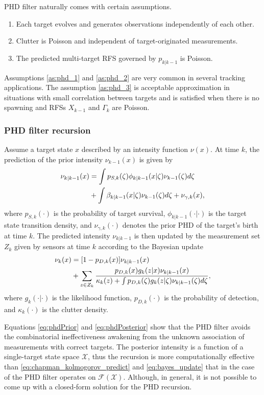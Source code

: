 PHD filter naturally comes with certain assumptions.
\begin{enumerate}
    \item Each target evolves and generates observations independently of each other. \label{as:phd_1}
    \item Clutter is Poisson and independent of target-originated measurements. \label{as:phd_2}
    \item The predicted multi-target RFS governed by $p_{k|k-1}$ is Poisson. \label{as:phd_3}
\end{enumerate}

Assumptions \ref{as:phd_1} and \ref{as:phd_2} are very common in several tracking applications. The assumption \ref{as:phd_3} is acceptable approximation in situations with small correlation between targets and is satisfied when
there is no spawning and RFSs $X_{k-1}$ and $\Gamma_k$ are Poisson.

            \subsubsection{PHD filter recursion}
Assume a target state $x$ described by an intensity function $\nu(x)$. At time $k$, the prediction of the prior intensity $\nu_{k-1}(x)$ is given by
\begin{align}
    \nu_{k|k-1}(x) &= \int p_{S,k}(\zeta)\phi_{k|k-1}(x|\zeta)\nu_{k-1}(\zeta)d\zeta \notag \\
        &+ \int \beta_{k|k-1}(x|\zeta) \nu_{k-1}(\zeta)d\zeta + \nu_{\gamma,k}(x),
    \label{eq:phdPrior}
\end{align}
where $p_{S,k}(\cdot)$ is the probability of target survival, $\phi_{k|k-1}(\cdot|\cdot)$ is the target state
transition density, and $\nu_{\gamma,k}(\cdot)$ denotes the prior PHD of the target's birth at time $k$.
The predicted intensity $\nu_{k|k-1}$ is then updated by the measurement set $Z_k$ given by sensors at time $k$ according to the Bayesian update
\begin{align}
        \nu_k(x) &= [1 - p_{D,k}(x)]\nu_{k|k-1}(x) \notag \\
        &+ \sum_{z \in Z_k}\frac{p_{D,k}(x) g_k(z|x) \nu_{k|k-1}(x)}{\kappa_k(z) + \int p_{D,k}(\zeta) g_k(z|\zeta) \nu_{k|k-1}(\zeta)d\zeta}, \label{eq:phdPosterior}
\end{align}
where $g_k(\cdot|\cdot)$ is the likelihood function, $p_{D,k}(\cdot)$ is the probability of detection, and $\kappa_k(\cdot)$ is the clutter density.

Equations \eqref{eq:phdPrior} and \eqref{eq:phdPosterior} show that the PHD filter avoids the combinatorial
ineffectiveness awakening from the unknown association of measurements with correct targets. The posterior intensity is
a function of a single-target state space $\mathcal{X}$, thus the recursion is more computationally effective than \eqref{eq:chapman_kolmogorov_predict} and \eqref{eq:bayes_update} that in the case of the PHD filter operates on $\mathcal{F(X)}$. Although, in general, it is not possible to come up with a closed-form solution for the PHD recursion.

